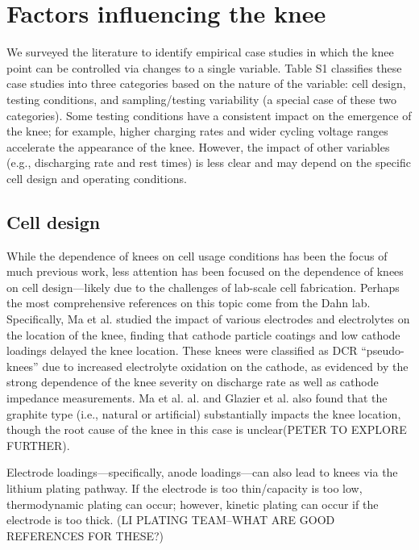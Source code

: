 \documentclass{article}
\begin{document}
\section{Factors influencing the knee}

We surveyed the literature to identify empirical case studies in which the knee point can be controlled via changes to a single variable. Table S1 classifies these case studies into three categories based on the nature of the variable: cell design, testing conditions, and sampling/testing variability (a special case of these two categories). Some testing conditions have a consistent impact on the emergence of the knee; for example, higher charging rates and wider cycling voltage ranges accelerate the appearance of the knee. However, the impact of other variables (e.g., discharging rate and rest times) is less clear and may depend on the specific cell design and operating conditions.

\subsection{Cell design}

While the dependence of knees on cell usage conditions has been the focus of much previous work, less attention has been focused on the dependence of knees on cell design---likely due to the challenges of lab-scale cell fabrication. Perhaps the most comprehensive references on this topic come from the Dahn lab. Specifically, Ma et al.\cite{ma_editors_2019} studied the impact of various electrodes and electrolytes on the location of the knee, finding that cathode particle coatings and low cathode loadings delayed the knee location. These knees were classified as DCR ``pseudo-knees'' due to increased electrolyte oxidation on the cathode, as evidenced by the strong dependence of the knee severity on discharge rate as well as cathode impedance measurements. Ma et al. al.\cite{ma_editors_2019} and Glazier et al.\cite{glazier_analysis_2017} also found that the graphite type (i.e., natural or artificial) substantially impacts the knee location, though the root cause of the knee in this case is unclear(PETER TO EXPLORE FURTHER).

Electrode loadings---specifically, anode loadings---can also lead to knees via the lithium plating pathway.
If the electrode is too thin/capacity is too low, thermodynamic plating can occur; however, kinetic plating can occur if the electrode is too thick. (LI PLATING TEAM--WHAT ARE GOOD REFERENCES FOR THESE?)
\end{document}
